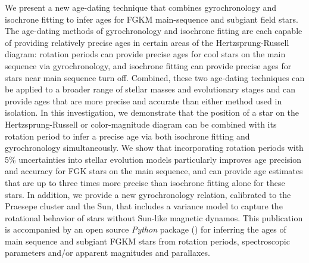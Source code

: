We present a new age-dating technique that combines gyrochronology and
isochrone fitting to infer ages for FGKM main-sequence and subgiant field
stars.
The age-dating methods of gyrochronology and isochrone fitting are each
capable of providing relatively precise ages in certain areas of the
Hertzsprung-Russell diagram: rotation periods can provide precise ages for
cool stars on the main sequence via gyrochronology, and isochrone fitting
can provide precise ages for stars near main sequence turn off.
Combined, these two age-dating techniques can be applied to a broader range of
stellar masses and evolutionary stages and can provide ages that are more
precise and accurate than either method used in isolation.
In this investigation, we demonstrate that the position of a star on the
Hertzsprung-Russell or color-magnitude diagram can be combined with its
rotation period to infer a precise age via both isochrone fitting and
gyrochronology simultaneously.
We show that incorporating rotation periods with 5\% uncertainties into
stellar evolution models particularly improves age precision and accuracy for
FGK stars on the main sequence, and can provide age estimates that are up to
three times more precise than isochrone fitting alone for these stars.
In addition, we provide a new gyrochronology relation, calibrated to the
Praesepe cluster and the Sun, that includes a variance model to capture the
rotational behavior of stars without Sun-like magnetic dynamos.
This publication is accompanied by an open source {\it Python} package (\sd)
for inferring the ages of main sequence and subgiant FGKM stars from rotation
periods, spectroscopic parameters and/or apparent magnitudes and parallaxes.
